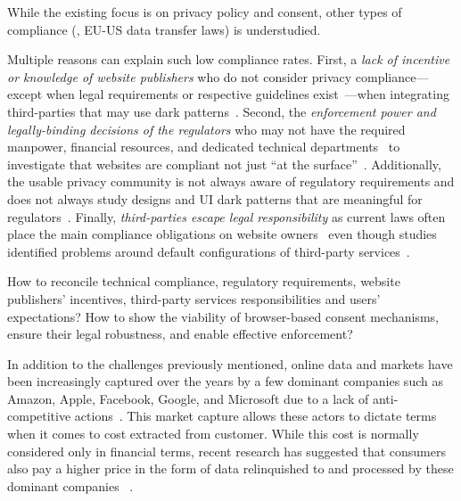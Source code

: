 \begin{opbox}
While the existing focus is on privacy policy and consent, other types of compliance (\eg{}, EU-US data transfer laws) is understudied.
\end{opbox}

Multiple reasons can explain such low compliance rates. First, a \textit{lack of incentive or knowledge of website publishers} who do not consider privacy compliance---except when legal requirements or respective guidelines exist~\cite{utzPrivacyRarelyConsidered2023,Stov-etal-23-PETs}---when integrating third-parties that may use dark patterns~\cite{tothDarkPatternsManipulation2022,grayDarkPatternsLegal2021}. Second, the \textit{enforcement power and legally-binding decisions of the regulators} who may not have the required manpower, financial resources, and dedicated technical departments~\cite{edpbContributionEDPBReport2023} to investigate that websites are compliant not just ``at the surface''~\cite{kyiInvestigatingDeceptiveDesign2023}. Additionally, the usable privacy community is not always aware of regulatory requirements and does not always study designs and UI dark patterns that are meaningful for regulators~\cite{Bielova2024-zr}. 
Finally, \textit{third-parties escape legal responsibility} as current laws often place the main compliance obligations on website owners~\cite{santosConsentManagementPlatforms2021} even though  studies identified problems around default configurations of third-party services~\cite{Koch-etal-25-PETs,Rodr-etal-25-PETs}.

\begin{opbox}
How to reconcile technical compliance, regulatory requirements, 
website publishers' incentives, third-party services responsibilities 
and users’ expectations?
How to show the viability of browser-based consent mechanisms, ensure their legal robustness, and enable effective enforcement?
\end{opbox}


In addition to the challenges previously mentioned, online data and markets have been increasingly captured over the years by a few dominant companies such as Amazon, Apple, Facebook, Google, and Microsoft due to a lack of anti-competitive actions~\cite{TargetedAdvertisingAutorite2025}. 
This market capture allows these actors to dictate terms when it comes to cost extracted from customer. While this cost is normally considered only in financial terms, recent research has suggested that consumers also pay a higher price in the form of data relinquished to and processed by these dominant companies ~\cite{khanAmazonsAntitrustParadox2017,munirGooglesChromeAntitrust2024}.


